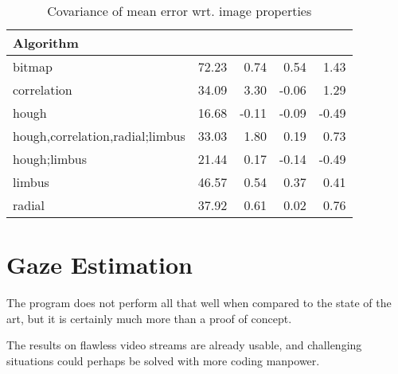 \begin{table}[b!]
\centering
\begin{tabular}{l@{\hspace{1.5cm}}D{.}{.}{3.2}D{.}{.}{3.2}D{.}{.}{3.2}D{.}{.}{3.2}}
\toprule
\textbf{Algorithm} &  &  &  & \\
\midrule
bitmap & 72.23 & 0.74 & 0.54 & 1.43\\
correlation & 34.09 & 3.30 & -0.06 & 1.29\\
hough & 16.68 & -0.11 & -0.09 & -0.49\\
hough,correlation,radial;limbus & 33.03 & 1.80 & 0.19 & 0.73\\
hough;limbus & 21.44 & 0.17 & -0.14 & -0.49\\
limbus & 46.57 & 0.54 & 0.37 & 0.41\\
radial & 37.92 & 0.61 & 0.02 & 0.76\\
\bottomrule
\end{tabular}
\caption{Covariance of mean error wrt. image properties}\label{t:algo-mean}
\end{table}


\section{Gaze Estimation}

The program does not perform all that well when compared to the state of the art, but it is certainly much more than a proof of concept.

The results on flawless video streams are already usable, and challenging situations could perhaps be solved with more coding manpower.
\todo{\dots}
